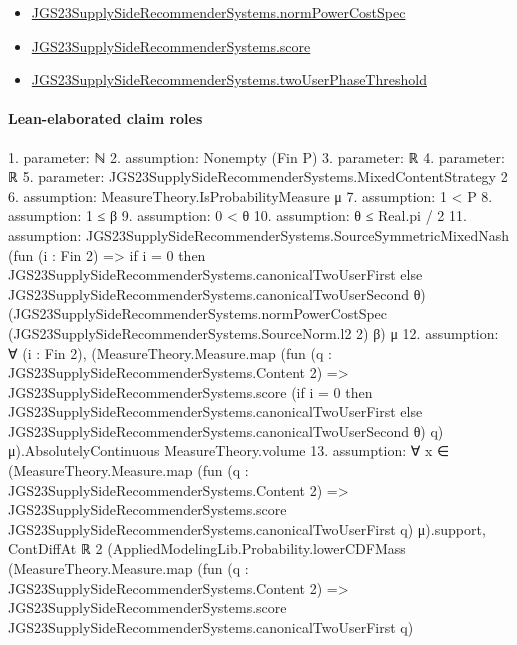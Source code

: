 \documentclass[10pt]{article}
\begin{document}
\begin{itemize}
\item \hyperlink{governing-declaration-6ba13dc1cae95e6e}{JGS23\allowbreak{}Supply\allowbreak{}Side\allowbreak{}Recommender\allowbreak{}Systems.\allowbreak{}norm\allowbreak{}Power\allowbreak{}Cost\allowbreak{}Spec}
\item \hyperlink{governing-declaration-e3725af4eb21c4db}{JGS23\allowbreak{}Supply\allowbreak{}Side\allowbreak{}Recommender\allowbreak{}Systems.\allowbreak{}score}
\item \hyperlink{governing-declaration-63bdc0df0d11c740}{JGS23\allowbreak{}Supply\allowbreak{}Side\allowbreak{}Recommender\allowbreak{}Systems.\allowbreak{}two\allowbreak{}User\allowbreak{}Phase\allowbreak{}Threshold}
\end{itemize}
\paragraph{Lean-elaborated claim roles}\begin{ReviewVerbatim}
1. parameter: ℕ
2. assumption: Nonempty (Fin P)
3. parameter: ℝ
4. parameter: ℝ
5. parameter: JGS23SupplySideRecommenderSystems.MixedContentStrategy 2
6. assumption: MeasureTheory.IsProbabilityMeasure μ
7. assumption: 1 < P
8. assumption: 1 ≤ β
9. assumption: 0 < θ
10. assumption: θ ≤ Real.pi / 2
11. assumption: JGS23SupplySideRecommenderSystems.SourceSymmetricMixedNash
  (fun (i : Fin 2) =>
    if i = 0 then JGS23SupplySideRecommenderSystems.canonicalTwoUserFirst
    else JGS23SupplySideRecommenderSystems.canonicalTwoUserSecond θ)
  (JGS23SupplySideRecommenderSystems.normPowerCostSpec (JGS23SupplySideRecommenderSystems.SourceNorm.l2 2) β) μ
12. assumption: ∀ (i : Fin 2),
  (MeasureTheory.Measure.map
        (fun (q : JGS23SupplySideRecommenderSystems.Content 2) =>
          JGS23SupplySideRecommenderSystems.score
            (if i = 0 then JGS23SupplySideRecommenderSystems.canonicalTwoUserFirst
            else JGS23SupplySideRecommenderSystems.canonicalTwoUserSecond θ)
            q)
        μ).AbsolutelyContinuous
    MeasureTheory.volume
13. assumption: ∀
  x ∈
    (MeasureTheory.Measure.map
        (fun (q : JGS23SupplySideRecommenderSystems.Content 2) =>
          JGS23SupplySideRecommenderSystems.score JGS23SupplySideRecommenderSystems.canonicalTwoUserFirst q)
        μ).support,
  ContDiffAt ℝ 2
    (AppliedModelingLib.Probability.lowerCDFMass
      (MeasureTheory.Measure.map
        (fun (q : JGS23SupplySideRecommenderSystems.Content 2) =>
          JGS23SupplySideRecommenderSystems.score JGS23SupplySideRecommenderSystems.canonicalTwoUserFirst q)

\end{ReviewVerbatim}
\end{document}
